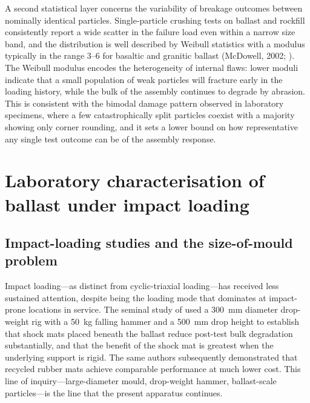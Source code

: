 A second statistical layer concerns the variability of breakage outcomes between nominally identical particles. Single-particle crushing tests on ballast and rockfill consistently report a wide scatter in the failure load even within a narrow size band, and the distribution is well described by Weibull statistics with a modulus typically in the range 3--6 for basaltic and granitic ballast (McDowell, 2002; \citealp{limmcdowell2004}). The Weibull modulus encodes the heterogeneity of internal flaws: lower moduli indicate that a small population of weak particles will fracture early in the loading history, while the bulk of the assembly continues to degrade by abrasion. This is consistent with the bimodal damage pattern observed in laboratory specimens, where a few catastrophically split particles coexist with a majority showing only corner rounding, and it sets a lower bound on how representative any single test outcome can be of the assembly response.

\section{Laboratory characterisation of ballast under impact loading}
\label{sec:impact-lab}

\subsection{Impact-loading studies and the size-of-mould problem}
\label{sec:size-effect}

Impact loading---as distinct from cyclic-triaxial loading---has received less sustained attention, despite being the loading mode that dominates at impact-prone locations in service. The seminal study of \citet{nimbalkar2012} used a \qty{300}{\mm} diameter drop-weight rig with a \qty{50}{\kg} falling hammer and a \qty{500}{\mm} drop height to establish that shock mats placed beneath the ballast reduce post-test bulk degradation substantially, and that the benefit of the shock mat is greatest when the underlying support is rigid. The same authors subsequently demonstrated that recycled rubber mats achieve comparable performance at much lower cost. This line of inquiry---large-diameter mould, drop-weight hammer, ballast-scale particles---is the line that the present apparatus continues.

